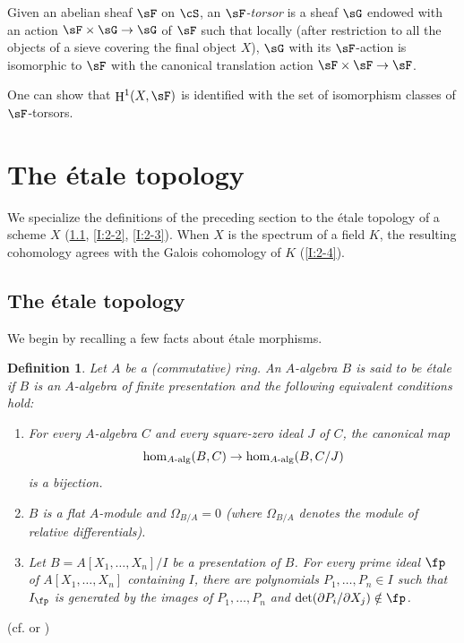 \documentclass[12pt,oneside,english]{smfbook}
\DeclareMathOperator{\h}{H}
\newtheorem{definition}[subsubsection]{Definition}
\begin{document}
Given an abelian sheaf $\sF$ on $\cS$, an \emph{$\sF$-torsor} is a sheaf $\sG$ endowed with an action $\sF\times\sG\to\sG$ of $\sF$ such that locally (after restriction to all the objects of a sieve covering the final object $X$), $\sG$ with its $\sF$-action is isomorphic to $\sF$ with the canonical translation action $\sF\times\sF\to\sF$.

One can show that $\h^1(X,\sF)$ is identified with the set of isomorphism classes of $\sF$-torsors.

\section{The étale topology}\label{I:2}

We specialize the definitions of the preceding section to the étale topology of a scheme $X$ (\ref{I:2-1}, \ref{I:2-2}, \ref{I:2-3}). When $X$ is the spectrum of a field $K$, the resulting cohomology agrees with the Galois cohomology of $K$ (\ref{I:2-4}).

\subsection{The étale topology}\label{I:2-1}

We begin by recalling a few facts about étale morphisms.

\begin{definition}\label{I:2-1-1}
Let $A$ be a (commutative) ring. An $A$-algebra $B$ is said to be étale if $B$ is an $A$-algebra of finite presentation and the following equivalent conditions hold:
\begin{enumerate}[\indent a)]
  \item For every $A$-algebra $C$ and every square-zero ideal $J$ of $C$, the canonical map
    \[
      \hom_{A\textnormal{-alg}}(B,C) \to \hom_{A\textnormal{-alg}}(B,C/J)
    \]
    is a bijection.
  \item $B$ is a flat $A$-module and $\Omega_{B/A}=0$ (where $\Omega_{B/A}$ denotes the module of relative differentials).
  \item Let $B=A[X_1,\dotsc,X_n]/I$ be a presentation of $B$. For every prime ideal $\fp$ of $A[X_1,\dotsc,X_n]$ containing $I$, there are polynomials $P_1,\dotsc,P_n\in I$ such that $I_\fp$ is generated by the images of $P_1,\dotsc,P_n$ and $\det(\partial P_i/\partial X_j)\notin\fp$.
\end{enumerate}
\end{definition}
(cf. \cite[I]{sga1} or \cite[V]{ra70})
\end{document}
